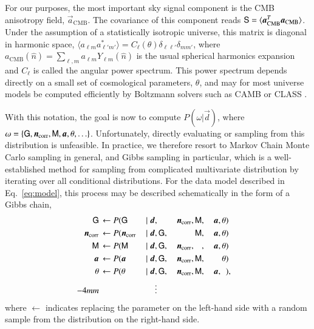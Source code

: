 \documentclass[twocolumn]{../common/aa}
\renewcommand{\d}[0]{\vec{d}}
\renewcommand{\G}[0]{\tens{G}}
\newcommand{\n}[0]{\vec{n}}
\renewcommand{\a}[0]{\vec{a}}
\newcommand{\M}[0]{\tens{M}}
\renewcommand{\S}[0]{\tens{S}}
\newcommand{\data}{\vec d}
\newcommand{\ncorr}{\vec n_\mathrm{corr}}
\begin{document}
For our purposes, the most important sky signal component is the CMB anisotropy field, $\a_{\mathrm{CMB}}$. The covariance of this component reads $\S = \langle \a_{\mathrm{CMB}}^T \a_{\mathrm{CMB}}\rangle$. Under the assumption of a statistically isotropic universe, this matrix is diagonal in harmonic space, $\langle a_{\ell m} a^*_{\ell' m'}\rangle = C_{\ell}(\theta) \delta_{\ell\ell'}\delta_{mm'}$, where $a_{\mathrm{CMB}}(\hat{n}) = \sum_{\ell,m} a_{\ell m} Y_{\ell m}(\hat{n})$ is the usual spherical harmonics expansion and $C_{\ell}$ is called the angular power spectrum. This power spectrum depends directly on a small set of cosmological parameters, $\theta$, and may for most universe models be computed efficiently by Boltzmann solvers such as CAMB \citep{Lewis:1999bs} or CLASS \citep{lesgourgues:2011}.

With this notation, the goal is now to compute $P(\omega|\d)$, where $\omega = \{\G, \n_{\mathrm{corr}}, \M, \a, \theta, \ldots\}$. Unfortunately, directly evaluating or sampling from this distribution is unfeasible. In practice, we therefore resort to Markov Chain Monte Carlo sampling in general, and Gibbs sampling in particular, which is a well-established method for sampling from complicated multivariate distribution by iterating over all conditional distributions. For the data model described in Eq.~\eqref{eq:model}, this process may be described schematically in the form of a Gibbs chain, 
  \begin{alignat}{9}
    \label{eq:gain_samp_dist}\G &\,\leftarrow          P(\G&\,               \mid \data, &\,\phantom{\G,} &\,\ncorr,&\,\M, &\,\a, &\,\theta)\\
    \label{eq:ncorr_samp_dist} \ncorr &\,\leftarrow    P(\ncorr&\,        \mid \data, &\,\G, &\,\phantom{\ncorr,}  &\,\M, &\,\a, &\,\theta)\\
    \label{eq:beta_samp}\M &\,\leftarrow                     P(\M &\, \mid \data, &\,\G, &\,\ncorr, &\,\phantom{\M}, &\,\a, &\,\theta)\\
    \a &\,\leftarrow                                   P(\a&\,            \mid \data, &\,\G, &\,\ncorr, &\,\M, &\,\phantom{\a,} &\,\theta)\\
    \theta &\,\leftarrow                             P(\theta &\,         \mid \data, &\,\G, &\,\ncorr, &\,\M, &\,\a,&\,\phantom{\theta})\label{eq:param_samp},\\\vspace*{-4mm}
     &&\vdots                             & & & & & & \nonumber
    \end{alignat}
  where $\leftarrow$ indicates replacing the parameter on the left-hand side with a random sample from the distribution on the right-hand side.
\end{document}
